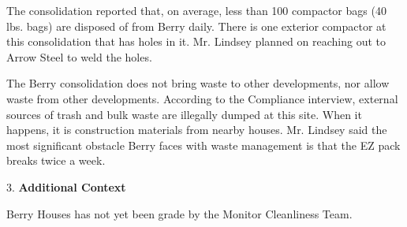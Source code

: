 The consolidation reported that, on average, less than 100 compactor bags (40 lbs. bags) are disposed of from Berry daily. There is one exterior compactor at this consolidation that has holes in it. Mr. Lindsey planned on reaching out to Arrow Steel to weld the holes. 

The Berry consolidation does not bring waste to other developments, nor allow waste from other developments. According to the Compliance interview, external sources of trash and bulk waste are illegally dumped at this site. When it happens, it is construction materials from nearby houses. Mr. Lindsey said the most significant obstacle Berry faces with waste management is that the EZ pack breaks twice a week.

3. \textbf{Additional Context} 

Berry Houses has not yet been grade by the Monitor Cleanliness Team.